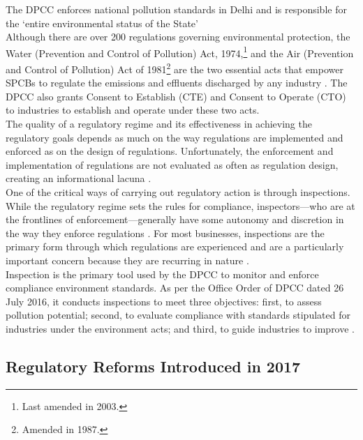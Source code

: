 \documentclass[a4paper, 12pt]{article}
\begin{document}
                 The DPCC enforces national pollution standards in Delhi and is responsible for the ‘entire environmental status of the State’ \parencite{NGT} \\
                 
                 Although there are over 200 regulations governing environmental protection, the Water (Prevention and Control of Pollution) Act, 1974,\footnote{Last amended in 2003.} and the Air (Prevention and Control of Pollution) Act of 1981\footnote{Amended in 1987.} are the two essential acts that empower SPCBs to regulate the emissions and effluents discharged by any industry \parencite{OECD06}. The DPCC also grants Consent to Establish (CTE) and Consent to Operate (CTO) to industries to establish and operate under these two acts. \\
                 
                 The quality of a regulatory regime and its effectiveness in achieving the regulatory goals depends as much on the way regulations are implemented and enforced as on the design of regulations. Unfortunately, the enforcement and implementation of regulations are not evaluated as often as regulation design, creating an informational lacuna \parencite{OECD14}. \\
                 
                 One of the critical ways of carrying out regulatory action is through inspections. While the regulatory regime sets the rules for compliance, inspectors—who are at the frontlines of enforcement—generally have some autonomy and discretion in the way they enforce regulations \parencite{May2003}. For most businesses, inspections are the primary form through which regulations are experienced and are a particularly important concern because they are recurring in nature \parencite{blancflorentin}. \\
                 
                 Inspection is the primary tool used by the DPCC to monitor and enforce compliance environment standards. As per the Office Order of DPCC dated 26 July 2016, it conducts inspections to meet three objectives: first, to assess pollution potential; second, to evaluate compliance with standards stipulated for industries under the environment acts; and third, to guide industries to improve \parencite{DPCCb}. \\
                 
                 \subsection{Regulatory Reforms Introduced in 2017}
                 
\end{document}
